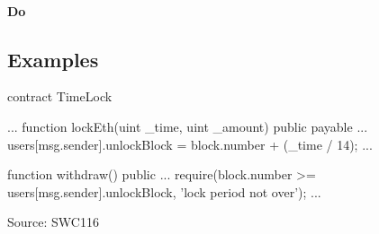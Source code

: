 \paragraph{Do }

\subsection{Examples} 
\begin{solidity} 
    contract TimeLock {
		...
		function lockEth(uint _time, uint _amount) public payable {
			...
			users[msg.sender].unlockBlock = block.number + (_time / 14);
			...
		}

    function withdraw() public {
		...
        require(block.number >= users[msg.sender].unlockBlock, 'lock period not over');
		...
    }
}
\end{solidity}
Source: SWC116 \cite{swc116}